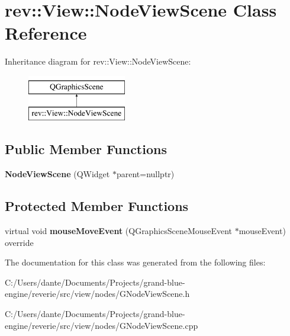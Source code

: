 \hypertarget{classrev_1_1_view_1_1_node_view_scene}{}\section{rev\+::View\+::Node\+View\+Scene Class Reference}
\label{classrev_1_1_view_1_1_node_view_scene}
Inheritance diagram for rev\+::View\+::Node\+View\+Scene\+:\begin{figure}[H]
\begin{center}
\leavevmode
\includegraphics[height=2.000000cm]{classrev_1_1_view_1_1_node_view_scene}
\end{center}
\end{figure}
\subsection*{Public Member Functions}
\begin{DoxyCompactItemize}
\item 
\mbox{\label{classrev_1_1_view_1_1_node_view_scene_a0b2255b20ee5855d9a7a540663834b16}} 
{\bfseries Node\+View\+Scene} (Q\+Widget $\ast$parent=nullptr)
\end{DoxyCompactItemize}
\subsection*{Protected Member Functions}
\begin{DoxyCompactItemize}
\item 
\mbox{\label{classrev_1_1_view_1_1_node_view_scene_ac97bd68b50c5460b3e63e8f9a632a481}} 
virtual void {\bfseries mouse\+Move\+Event} (Q\+Graphics\+Scene\+Mouse\+Event $\ast$mouse\+Event) override
\end{DoxyCompactItemize}


The documentation for this class was generated from the following files\+:\begin{DoxyCompactItemize}
\item 
C\+:/\+Users/dante/\+Documents/\+Projects/grand-\/blue-\/engine/reverie/src/view/nodes/G\+Node\+View\+Scene.\+h\item 
C\+:/\+Users/dante/\+Documents/\+Projects/grand-\/blue-\/engine/reverie/src/view/nodes/G\+Node\+View\+Scene.\+cpp\end{DoxyCompactItemize}
